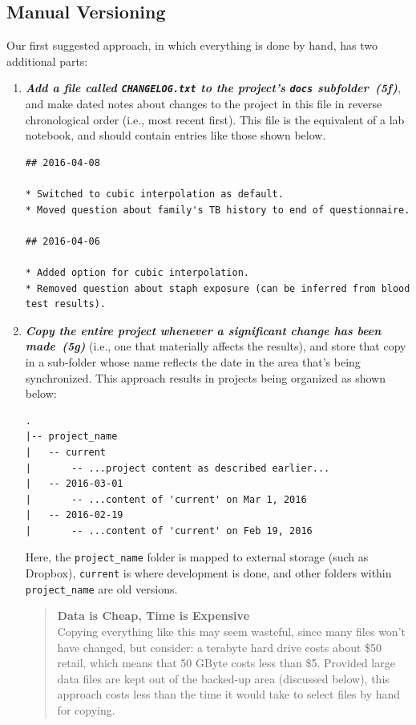 \documentclass[10pt,letterpaper]{article}
\newcommand{\practice}[2]{\textbf{\emph{{#2}~({#1})}}}
\begin{document}
\subsection*{Manual Versioning}

Our first suggested approach, in which everything is done by hand, has
two additional parts:

\begin{enumerate}

\item

  \practice{5f}{Add a file called \texttt{CHANGELOG.txt} to the
  project's \texttt{docs} subfolder}, and make dated notes about
  changes to the project in this file in reverse chronological order
  (i.e., most recent first). This file is the equivalent of a lab
  notebook, and should contain entries like those shown below.

{\small
\begin{verbatim}
## 2016-04-08

* Switched to cubic interpolation as default.
* Moved question about family's TB history to end of questionnaire.

## 2016-04-06

* Added option for cubic interpolation.
* Removed question about staph exposure (can be inferred from blood test results).
\end{verbatim}
}

\item

  \practice{5g}{Copy the entire project whenever a significant change
  has been made} (i.e., one that materially affects the results),
  and store that copy in a sub-folder whose name reflects the date in
  the area that's being synchronized. This approach results in
  projects being organized as shown below:

{\small
\begin{verbatim}
.
|-- project_name
|   -- current
|       -- ...project content as described earlier...
|   -- 2016-03-01
|       -- ...content of 'current' on Mar 1, 2016
|   -- 2016-02-19
|       -- ...content of 'current' on Feb 19, 2016
\end{verbatim}
}

  Here, the \texttt{project\_name} folder is mapped to external
  storage (such as Dropbox), \texttt{current} is where development is
  done, and other folders within \texttt{project\_name} are old
  versions.

  \begin{quote}
    \noindent \textbf{Data is Cheap, Time is Expensive}
    \\
    Copying everything like this may seem wasteful, since many files
    won't have changed, but consider: a terabyte hard drive costs
    about \$50 retail, which means that 50 GByte costs less than
    \$5. Provided large data files are kept out of the backed-up area
    (discussed below), this approach costs less than the time it would
    take to select files by hand for copying.
  \end{quote}

\end{enumerate}
\end{document}
